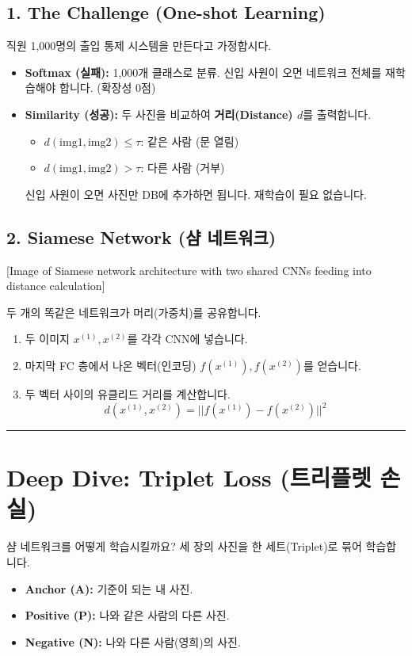 \documentclass[11pt,a4paper]{book}
\theoremstyle{definition}
\begin{document}
\subsection{1. The Challenge (One-shot Learning)}
직원 1,000명의 출입 통제 시스템을 만든다고 가정합시다.
\begin{itemize}
    \item \textbf{Softmax (실패):} 1,000개 클래스로 분류. 신입 사원이 오면 네트워크 전체를 재학습해야 합니다. (확장성 0점)
    \item \textbf{Similarity (성공):} 두 사진을 비교하여 \textbf{거리(Distance) $d$}를 출력합니다.
    \begin{itemize}
        \item $d(\text{img1}, \text{img2}) \le \tau$: 같은 사람 (문 열림)
        \item $d(\text{img1}, \text{img2}) > \tau$: 다른 사람 (거부)
    \end{itemize}
    신입 사원이 오면 사진만 DB에 추가하면 됩니다. 재학습이 필요 없습니다.
\end{itemize}

\subsection{2. Siamese Network (샴 네트워크)}
[Image of Siamese network architecture with two shared CNNs feeding into distance calculation]

두 개의 똑같은 네트워크가 머리(가중치)를 공유합니다.
\begin{enumerate}
    \item 두 이미지 $x^{(1)}, x^{(2)}$를 각각 CNN에 넣습니다.
    \item 마지막 FC 층에서 나온 벡터(인코딩) $f(x^{(1)}), f(x^{(2)})$를 얻습니다.
    \item 두 벡터 사이의 유클리드 거리를 계산합니다.
    $$ d(x^{(1)}, x^{(2)}) = || f(x^{(1)}) - f(x^{(2)}) ||^2 $$
\end{enumerate}

\vspace{0.5cm}\hrule\vspace{0.5cm}

\section{Deep Dive: Triplet Loss (트리플렛 손실)}

샴 네트워크를 어떻게 학습시킬까요? 세 장의 사진을 한 세트(Triplet)로 묶어 학습합니다.

\begin{itemize}
    \item \textbf{Anchor (A):} 기준이 되는 내 사진.
    \item \textbf{Positive (P):} 나와 같은 사람의 다른 사진.
    \item \textbf{Negative (N):} 나와 다른 사람(영희)의 사진.
\end{itemize}
\end{document}
